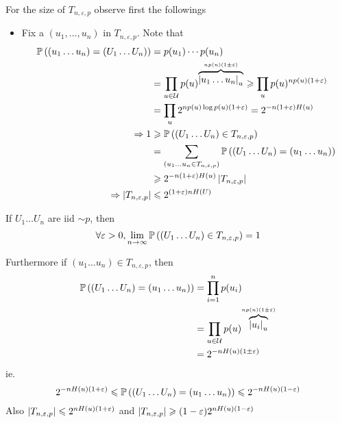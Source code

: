 For the size of $T_{n, \varepsilon, p}$ observe first the followings
\begin{itemize}
    \item Fix a $(u_1,\ldots,u_n)$ in $T_{n,\varepsilon, p}$. Note that
    \[
        \begin{aligned}
            \mathbb{P}\left( (u_1 \ldots u_n)=(U_1 \ldots U_n) \right) &= p(u_1)\cdots p(u_n)\\
            &= \prod\limits_{u\in\mathcal{U}}p(u)^{\overbrace{\left\lvert u_1\ldots u_n\right\rvert_u}^{np(n)(1\pm\varepsilon)}} \geqslant \prod\limits_u p(u)^{np(u)(1+\varepsilon)}\\
            &= \prod\limits_u 2^{np(u)\log p(u)(1+\varepsilon)} = 2^{-n(1+\varepsilon)H(u)}\\
            \Rightarrow 1 &\geqslant \mathbb{P}\left( (U_1\ldots U_n)\in T_{n,\varepsilon,p} \right)\\
            &= \sum\limits_{(u_1\ldots u_n \in T_{n,\varepsilon,p})} \mathbb{P}\left( (U_1\ldots U_n) = (u_1\ldots u_n) \right)\\
            & \geqslant 2^{-n(1+\varepsilon)H(u)}\left\lvert T_{n,\varepsilon,p}\right\rvert\\
            \Rightarrow \left\lvert T_{n,\varepsilon,p}\right\rvert &\leqslant 2 ^{(1+\varepsilon)nH(U)}
        \end{aligned}
    \]
\end{itemize}

\begin{theorem}
    If $U_1\ldots U_n$ are iid $\sim p$, then
    \[
        \forall \varepsilon > 0, \lim\limits_{n\to\infty}\mathbb{P}\left( (U_1 \ldots U_n) \in T_{n, \varepsilon, p} \right) = 1
    \]
    
    Furthermore if $(u_1 \ldots u_n)\in T_{n,\varepsilon, p}$, then
    \[
        \begin{aligned}
            \mathbb{P}\left( (U_1 \ldots U_n) = (u_1 \ldots u_n) \right) &= \prod\limits_{i=1}^n p(u_i)\\
            &= \prod\limits_{u\in\mathcal{U}} p(u) ^{\overbrace{\left\lvert u_i\right\rvert_u}^{np(n)(1\pm\varepsilon)}}\\
            &= 2^{-nH(u)(1\pm\varepsilon)}
        \end{aligned}
    \]
    ie.
    \[
        2^{-nH(u)(1+\varepsilon)} \leqslant \mathbb{P}\left( (U_1 \ldots U_n) = (u_1 \ldots u_n) \right) \leqslant 2^{-nH(u)(1-\varepsilon)}
    \]
    Also $\left\lvert T_{n,\varepsilon,p}\right\rvert \leqslant 2^{nH(u)(1+\varepsilon)}$ and $\left\lvert T_{n,\varepsilon,p}\right\rvert \geqslant (1-\varepsilon) 2^{nH(u)(1-\varepsilon)}$
\end{theorem}

